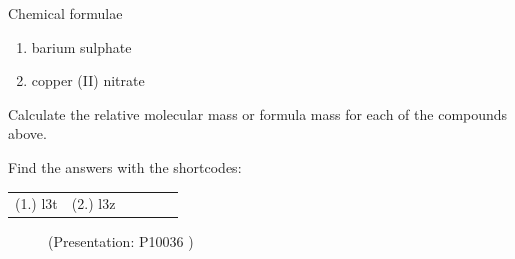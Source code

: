 \begin{exercises}{Chemical formulae
        }
\begin{enumerate}[noitemsep, label=\textbf{\arabic*}. ]
\begin{enumerate}[noitemsep, label=\textbf{\alph*}. ]
\label{m38689*uid106}\item barium sulphate
\item copper (II) nitrate
\end{enumerate}
Calculate the relative molecular mass or formula mass for each of the compounds above.
                \end{enumerate}
\label{m38689*cid121}
\par {} Find the answers with the shortcodes:
 \par \begin{tabular}[h]{cccccc}
 (1.) l3t  &  (2.) l3z  & \end{tabular}
\end{exercises}
    \label{m38689*eip-891}
    \setcounter{subfigure}{0}
	\begin{figure}[H] %
    \label{m38689*slidesharemedia}\label{m38689*slideshareflash} { (Presentation:  P10036 )}
 \end{figure}       \par \label{m38689*cid13}
